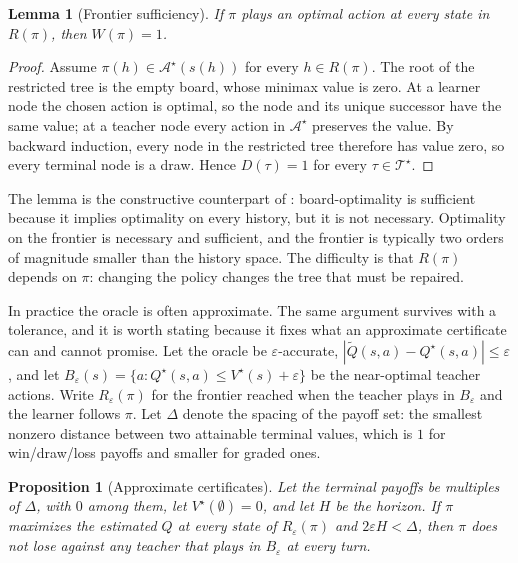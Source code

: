 \documentclass[conference]{IEEEtran}
\newtheorem{proposition}{Proposition}
\newtheorem{lemma}{Lemma}
\begin{document}
\begin{lemma}[Frontier sufficiency]
\label{lem:frontier}
If $\pi$ plays an optimal action at every state in $R(\pi)$, then $W(\pi)=1$.
\end{lemma}

\begin{proof}
Assume $\pi(h)\in\mathcal{A}^{\star}(s(h))$ for every $h\in R(\pi)$. The root of the restricted tree is the empty board, whose minimax value is zero. At a learner node the chosen action is optimal, so the node and its unique successor have the same value; at a teacher node every action in $\mathcal{A}^{\star}$ preserves the value. By backward induction, every node in the restricted tree therefore has value zero, so every terminal node is a draw. Hence $D(\tau)=1$ for every $\tau\in\mathcal{T}^{\star}$.
\end{proof}

The lemma is the constructive counterpart of : board-optimality is sufficient because it implies optimality on every history, but it is not necessary. Optimality on the frontier is necessary and sufficient, and the frontier is typically two orders of magnitude smaller than the history space. The difficulty is that $R(\pi)$ depends on $\pi$: changing the policy changes the tree that must be repaired.

In practice the oracle is often approximate. The same argument survives with a tolerance, and it is worth stating because it fixes what an approximate certificate can and cannot promise. Let the oracle be $\varepsilon$-accurate, $|\tilde Q(s,a)-Q^{\star}(s,a)|\le\varepsilon$, and let $B_\varepsilon(s)=\{a:Q^{\star}(s,a)\le V^{\star}(s)+\varepsilon\}$ be the near-optimal teacher actions. Write $R_\varepsilon(\pi)$ for the frontier reached when the teacher plays in $B_\varepsilon$ and the learner follows $\pi$. Let $\Delta$ denote the spacing of the payoff set: the smallest nonzero distance between two attainable terminal values, which is $1$ for win/draw/loss payoffs and smaller for graded ones.

\begin{proposition}[Approximate certificates]
\label{prop:approx}
Let the terminal payoffs be multiples of $\Delta$, with $0$ among them, let $V^{\star}(\emptyset)=0$, and let $H$ be the horizon. If $\pi$ maximizes the estimated $Q$ at every state of $R_\varepsilon(\pi)$ and $2\varepsilon H<\Delta$, then $\pi$ does not lose against any teacher that plays in $B_\varepsilon$ at every turn.
\end{proposition}
\end{document}
